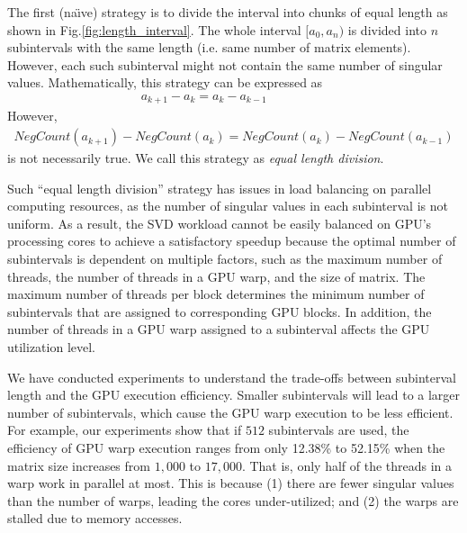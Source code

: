 The first (na\"{\i}ve) strategy is to divide the interval into chunks of equal length as shown in Fig.\ref{fig:length_interval}.
The whole interval $[a_0, a_n)$ is divided into $n$ subintervals with
the same length (i.e. same number of matrix elements). However, each
such  subinterval might not contain the same number of singular values.
Mathematically, this strategy can be expressed as
\begin{eqnarray}
a_{k+1}-a_k = a_{k}-a_{k-1} \hspace{2cm} 
\end{eqnarray}
However,
\begin{eqnarray}
NegCount(a_{k+1})-NegCount(a_{k}) = NegCount(a_{k})-NegCount(a_{k-1})
\end{eqnarray}
is not necessarily true. We call this strategy as {\it equal length division}.

%

Such ``equal length division'' strategy has issues in load balancing on 
parallel computing resources, as the number of singular values in each
subinterval is not uniform. As a result,
the SVD workload cannot be easily balanced on GPU's processing cores to achieve a satisfactory speedup because the optimal number of subintervals is dependent on multiple factors, such as the maximum number of threads, the number of threads in a GPU warp, and the size of matrix.
The maximum number of threads per block determines the minimum number
of subintervals that are assigned to corresponding GPU blocks.
In addition, the number of threads in a GPU warp assigned to a subinterval affects the GPU utilization level.

We have conducted experiments to understand the trade-offs %
between subinterval length
and the GPU execution efficiency. Smaller subintervals will lead to a larger number of subintervals, which cause the GPU warp execution to be less efficient. 
For example, our experiments show that if $512$ subintervals are used, the efficiency of GPU warp execution ranges from only 12.38\% to 52.15\% when the matrix size increases from $1,000$ to $17,000$.
That is, only half of the threads in a warp work in parallel at most. This is because  (1)
 there are fewer singular values than the number of warps, leading the cores under-utilized; and 
(2) the warps are stalled due to memory accesses.

